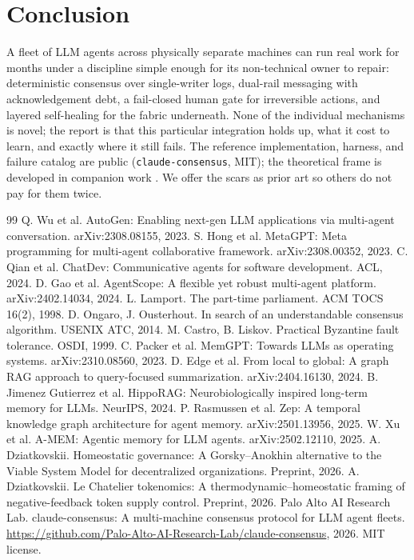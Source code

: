 \documentclass[11pt]{article}
\begin{document}
\section{Conclusion}
A fleet of LLM agents across physically separate machines can run real work for months under a discipline simple enough for its non-technical owner to repair: deterministic consensus over single-writer logs, dual-rail messaging with acknowledgement debt, a fail-closed human gate for irreversible actions, and layered self-healing for the fabric underneath. None of the individual mechanisms is novel; the report is that this particular integration holds up, what it cost to learn, and exactly where it still fails. The reference implementation, harness, and failure catalog are public (\texttt{claude-consensus}, MIT); the theoretical frame is developed in companion work \cite{homeostatic,lechatelier}. We offer the scars as prior art so others do not pay for them twice.

\begin{thebibliography}{99}
 Q. Wu et al. AutoGen: Enabling next-gen LLM applications via multi-agent conversation. arXiv:2308.08155, 2023.
 S. Hong et al. MetaGPT: Meta programming for multi-agent collaborative framework. arXiv:2308.00352, 2023.
 C. Qian et al. ChatDev: Communicative agents for software development. ACL, 2024.
 D. Gao et al. AgentScope: A flexible yet robust multi-agent platform. arXiv:2402.14034, 2024.
 L. Lamport. The part-time parliament. ACM TOCS 16(2), 1998.
 D. Ongaro, J. Ousterhout. In search of an understandable consensus algorithm. USENIX ATC, 2014.
 M. Castro, B. Liskov. Practical Byzantine fault tolerance. OSDI, 1999.
 C. Packer et al. MemGPT: Towards LLMs as operating systems. arXiv:2310.08560, 2023.
 D. Edge et al. From local to global: A graph RAG approach to query-focused summarization. arXiv:2404.16130, 2024.
 B. Jimenez Gutierrez et al. HippoRAG: Neurobiologically inspired long-term memory for LLMs. NeurIPS, 2024.
 P. Rasmussen et al. Zep: A temporal knowledge graph architecture for agent memory. arXiv:2501.13956, 2025.
 W. Xu et al. A-MEM: Agentic memory for LLM agents. arXiv:2502.12110, 2025.
 A. Dziatkovskii. Homeostatic governance: A Gorsky--Anokhin alternative to the Viable System Model for decentralized organizations. Preprint, 2026.
 A. Dziatkovskii. Le Chatelier tokenomics: A thermodynamic--homeostatic framing of negative-feedback token supply control. Preprint, 2026.
 Palo Alto AI Research Lab. claude-consensus: A multi-machine consensus protocol for LLM agent fleets. \url{https://github.com/Palo-Alto-AI-Research-Lab/claude-consensus}, 2026. MIT license.
\end{thebibliography}
\end{document}

